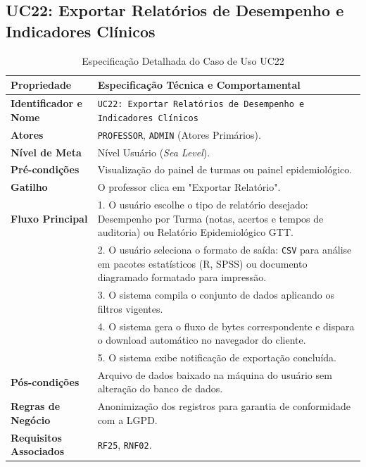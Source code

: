\subsection{UC22: Exportar Relatórios de Desempenho e Indicadores Clínicos}
\label{uc22_especificacao}

\begin{table}[!ht]
\centering
\caption{Especificação Detalhada do Caso de Uso UC22}
\label{tab_uc22}
\footnotesize
\begin{tabularx}{\textwidth}{p{3.5cm} X}
\toprule
\textbf{Propriedade} & \textbf{Especificação Técnica e Comportamental} \\
\midrule
\textbf{Identificador e Nome} & \texttt{UC22: Exportar Relatórios de Desempenho e Indicadores Clínicos} \\
\textbf{Atores} & \texttt{PROFESSOR}, \texttt{ADMIN} (Atores Primários). \\
\textbf{Nível de Meta} & Nível Usuário (\textit{Sea Level}). \\
\textbf{Pré-condições} & Visualização do painel de turmas ou painel epidemiológico. \\
\textbf{Gatilho} & O professor clica em "Exportar Relatório". \\
\textbf{Fluxo Principal} & 
1. O usuário escolhe o tipo de relatório desejado: Desempenho por Turma (notas, acertos e tempos de auditoria) ou Relatório Epidemiológico GTT.\\
& 2. O usuário seleciona o formato de saída: \texttt{CSV} para análise em pacotes estatísticos (R, SPSS) ou documento diagramado formatado para impressão.\\
& 3. O sistema compila o conjunto de dados aplicando os filtros vigentes.\\
& 4. O sistema gera o fluxo de bytes correspondente e dispara o download automático no navegador do cliente.\\
& 5. O sistema exibe notificação de exportação concluída. \\
\textbf{Pós-condições} & Arquivo de dados baixado na máquina do usuário sem alteração do banco de dados. \\
\textbf{Regras de Negócio} & Anonimização dos registros para garantia de conformidade com a LGPD. \\
\textbf{Requisitos Associados} & \texttt{RF25}, \texttt{RNF02}. \\
\bottomrule
\end{tabularx}
\end{table}
